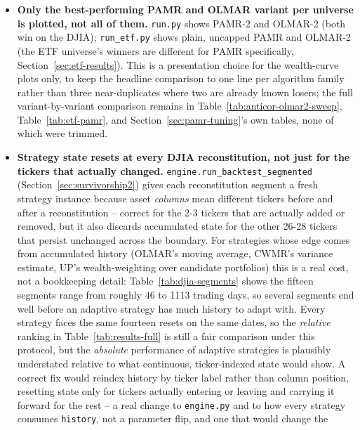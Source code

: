 \documentclass[11pt]{article}
\begin{document}
\begin{itemize}
    Reported here rather than quietly dropped, per this paper's own
    standard for findings that do not resolve cleanly.
    \item \textbf{Only the best-performing PAMR and OLMAR variant per
    universe is plotted, not all of them.} \texttt{run.py} shows PAMR-2
    and OLMAR-2 (both win on the DJIA); \texttt{run\_etf.py} shows plain,
    uncapped PAMR and OLMAR-2 (the ETF universe's winners are different
    for PAMR specifically, Section~\ref{sec:etf-results}). This is a
    presentation choice for the wealth-curve plots only, to keep the
    headline comparison to one line per algorithm family rather than
    three near-duplicates where two are already known losers; the full
    variant-by-variant comparison remains in
    Table~\ref{tab:anticor-olmar2-sweep}, Table~\ref{tab:etf-pamr}, and
    Section~\ref{sec:pamr-tuning}'s own tables, none of which were
    trimmed.
    \item \textbf{Strategy state resets at every DJIA reconstitution, not
    just for the tickers that actually changed.}
    \texttt{engine.run\_backtest\_segmented} (Section~\ref{sec:survivorship2})
    gives each reconstitution segment a fresh strategy instance because
    asset \emph{columns} mean different tickers before and after a
    reconstitution -- correct for the 2-3 tickers that are actually added
    or removed, but it also discards accumulated state for the other
    26-28 tickers that persist unchanged across the boundary. For
    strategies whose edge comes from accumulated history (OLMAR's moving
    average, CWMR's variance estimate, UP's wealth-weighting over
    candidate portfolios) this is a real cost, not a bookkeeping detail:
    Table~\ref{tab:djia-segments} shows the fifteen segments range from
    roughly 46 to 1113 trading days, so several segments end well before
    an adaptive strategy has much history to adapt with. Every strategy
    faces the same fourteen resets on the same dates, so the
    \emph{relative} ranking in Table~\ref{tab:results-full} is still a
    fair comparison under this protocol, but the \emph{absolute}
    performance of adaptive strategies is plausibly understated relative
    to what continuous, ticker-indexed state would show. A correct fix
    would reindex history by ticker label rather than column position,
    resetting state only for tickers actually entering or leaving and
    carrying it forward for the rest -- a real change to
    \texttt{engine.py} and to how every strategy consumes
    \texttt{history}, not a parameter flip, and one that would change the

\end{itemize}
\end{document}
